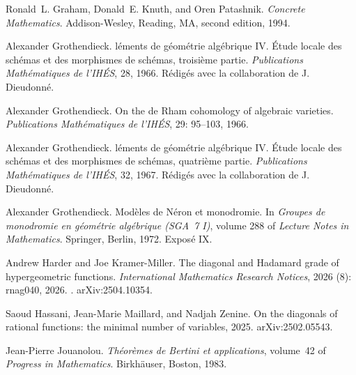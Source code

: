 \documentclass[11pt]{amsart}
\theoremstyle{definition}
\theoremstyle{remark}
\numberwithin{equation}{section}
\begin{document}
\begin{thebibliography}{48}
Ronald~L. Graham, Donald~E. Knuth, and Oren Patashnik.
\newblock \emph{Concrete Mathematics}.
\newblock Addison-Wesley, Reading, MA, second edition, 1994.

Alexander Grothendieck.
l{\'e}ments de g{\'e}om{\'e}trie alg{\'e}brique {IV}.
  {{\'E}tude} locale des sch{\'e}mas et des morphismes de sch{\'e}mas,
  troisi{\`e}me partie.
\newblock \emph{Publications Math{\'e}matiques de l'IH{\'E}S}, 28,
  1966{}.
\newblock R{\'e}dig{\'e}s avec la collaboration de J. Dieudonn{\'e}.

Alexander Grothendieck.
\newblock On the de {R}ham cohomology of algebraic varieties.
\newblock \emph{Publications Math{\'e}matiques de l'IH{\'E}S}, 29:
  95--103, 1966{}.

Alexander Grothendieck.
l{\'e}ments de g{\'e}om{\'e}trie alg{\'e}brique {IV}.
  {{\'E}tude} locale des sch{\'e}mas et des morphismes de sch{\'e}mas,
  quatri{\`e}me partie.
\newblock \emph{Publications Math{\'e}matiques de l'IH{\'E}S}, 32, 1967.
\newblock R{\'e}dig{\'e}s avec la collaboration de J. Dieudonn{\'e}.

Alexander Grothendieck.
\newblock Mod{\`e}les de {N}{\'e}ron et monodromie.
\newblock In \emph{Groupes de monodromie en g{\'e}om{\'e}trie alg{\'e}brique
  ({SGA}~7 {I})}, volume 288 of \emph{Lecture Notes in Mathematics}. Springer,
  Berlin, 1972.
\newblock Expos{\'e} {IX}.

Andrew Harder and Joe Kramer-Miller.
\newblock The diagonal and {H}adamard grade of hypergeometric functions.
\newblock \emph{International Mathematics Research Notices}, 2026
  (8): rnag040, 2026.
\newblock {}.
\newblock arXiv:2504.10354.

Saoud Hassani, Jean-Marie Maillard, and Nadjah Zenine.
\newblock On the diagonals of rational functions: the minimal number of
  variables, 2025.
\newblock arXiv:2502.05543.

Jean-Pierre Jouanolou.
\newblock \emph{Th{\'e}or{\`e}mes de {B}ertini et applications}, volume~42 of
  \emph{Progress in Mathematics}.
\newblock Birkh{\"a}user, Boston, 1983.


\end{thebibliography}
\end{document}
